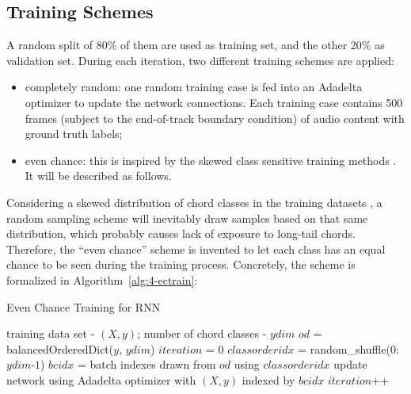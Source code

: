 \subsection{Training Schemes}
A random split of 80\% of them are used as training set, and the other 20\% as validation set. During each iteration, two different training schemes are applied:
\begin{itemize}
\item completely random: one random training case is fed into an Adadelta optimizer \cite{zeiler2012adadelta} to update the network connections. Each training case contains 500 frames (subject to the end-of-track boundary condition) of audio content with ground truth labels;
\item even chance: this is inspired by the skewed class sensitive training methods \cite{chawla2004editorial}. It will be described as follows.
\end{itemize}
Considering a skewed distribution of chord classes in the training datasets \cite{burgoyne2011expert}, a random sampling scheme will inevitably draw samples based on that same distribution, which probably causes lack of exposure to long-tail chords. Therefore, the ``even chance'' scheme is invented to let each class has an equal chance to be seen during the training process. Concretely, the scheme is formalized in Algorithm~\ref{alg:4-ectrain}:
\begin{algorithm}[h]
	\caption{Even Chance Training for RNN}
	\label{alg:4-ectrain}
	\begin{algorithmic}
	\REQUIRE
	training data set - $(X,y)$;
	number of chord classes - $ydim$
	\STATE $od$ = balancedOrderedDict($y$, $ydim$)
	\STATE $iteration$ = $0$
	\STATE $classorderidx$ = random\_shuffle($0$:$ydim$-$1$)
	\ENDIF
	\STATE $bcidx$ = batch indexes drawn from $od$ using $classorderidx$
	\STATE update network using Adadelta optimizer with $(X,y)$ indexed by $bcidx$
	\STATE $iteration$++
	\ENDWHILE
	\end{algorithmic}
\end{algorithm}

